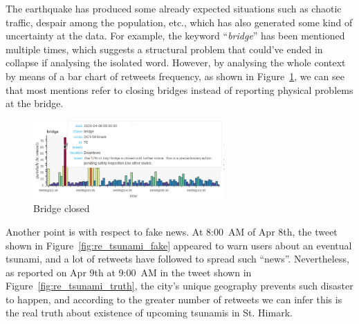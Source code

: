 The earthquake has produced some already expected situations such as chaotic
traffic, despair among the population, etc., which has also generated some kind
of uncertainty at the data. For example, the keyword ``\emph{bridge}'' has been
mentioned multiple times, which suggests a structural problem that could've
ended in collapse if analysing the isolated word. However, by analysing the
whole context by means of a bar chart of retweets frequency, as shown in
Figure~\ref{fig:re_bridge_vbar}, we can see that most mentions refer to closing
bridges instead of reporting physical problems at the bridge.

\begin{figure}[!h]
    \centering
    \includegraphics[width=0.65\textwidth]{figs/q3/re_bridge_vbar.png}
    \caption{Bridge closed}
    \label{fig:re_bridge_vbar}
\end{figure}

Another point is with respect to fake news. At 8:00~AM of Apr 8th, the tweet
shown in Figure~\ref{fig:re_tsunami_fake}
appeared to warn users about an eventual tsunami, and a lot of retweets have
followed to spread such ``news''. Nevertheless, as reported on Apr 9th at
9:00~AM in the tweet shown in Figure~\ref{fig:re_tsunami_truth}, the city's
unique geography prevents such disaster to happen, and according to the greater
number of retweets we can infer this is the real truth about existence of
upcoming tsunamis in St. Himark.


